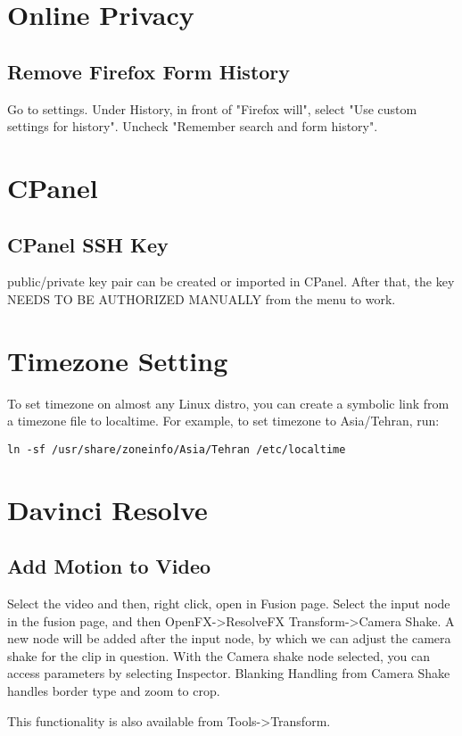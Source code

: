 \documentclass{article}
\begin{document}
\section{Online Privacy}
\subsection{Remove Firefox Form History}
Go to settings. Under History, in front of "Firefox will", select "Use custom settings for history". Uncheck "Remember search and form history". 

\section{CPanel}
\subsection{CPanel SSH Key}
public/private key pair can be created or imported in CPanel. After that, the key NEEDS TO BE AUTHORIZED MANUALLY from the menu to work. 

\section{Timezone Setting}
To set timezone on almost any Linux distro, you can create a symbolic link from  a timezone file to localtime. For example, to set timezone to Asia/Tehran, run:   
\begin{verbatim}
ln -sf /usr/share/zoneinfo/Asia/Tehran /etc/localtime 
\end{verbatim}


\section{Davinci Resolve}
\subsection{Add Motion to Video}
Select the video and then, right click, open in Fusion page. Select the input node in the fusion page, and then OpenFX->ResolveFX Transform->Camera Shake. A new node will be added after the input node, by which we can adjust the camera shake for the clip in question. 
With the Camera shake node selected, you can access parameters by selecting Inspector. 
Blanking Handling from Camera Shake handles border type and zoom to crop. 

This functionality is also available from Tools->Transform. 
\end{document}
